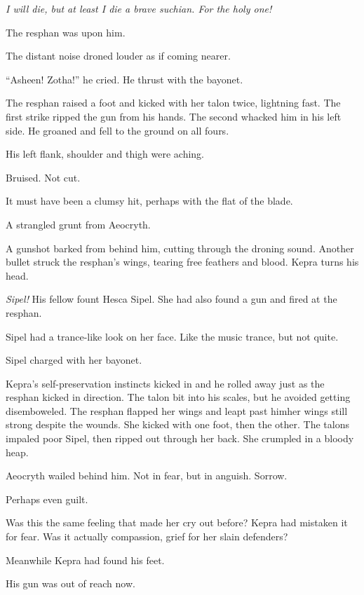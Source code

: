 \documentclass
  [a4paper,
   12pt,
   oneside
  ]%
  {article}
\begin{document}
\emph{I will die, but at least I die a brave suchian. For the holy one!} 

The resphan was upon him.

The distant noise droned louder as if coming nearer.

``Asheen! Zotha!'' he cried. He thrust with the bayonet.

The resphan raised a foot and kicked with her talon twice, lightning fast. 
The first strike ripped the gun from his hands. 
The second whacked him in his left side. He groaned and fell to the ground on all fours. 

His left flank, shoulder and thigh were aching. 

Bruised. Not cut. 

It must have been a clumsy hit, perhaps with the flat of the blade. 

A strangled grunt from Aeocryth.

A gunshot barked from behind him, cutting through the droning sound. 
Another bullet struck the resphan’s wings, tearing free feathers and blood. 
Kepra turns his head. 

\emph{Sipel!} His fellow fount Hesca Sipel. She had also found a gun and fired at the resphan.

Sipel had a trance-like look on her face.
Like the music trance, but not quite.

Sipel charged with her bayonet. 

Kepra's self-preservation instincts kicked in and he rolled away just as the resphan kicked in direction. 
The talon bit into his scales, but he avoided getting disemboweled.
The resphan flapped her wings and leapt past him\dash{}her wings still strong despite the wounds. 
She kicked with one foot, then the other.
The talons impaled poor Sipel, then ripped out through her back. 
She crumpled in a bloody heap.

Aeocryth wailed behind him. 
Not in fear, but in anguish.
Sorrow. 

Perhaps even guilt.

Was this the same feeling that made her cry out before? Kepra had mistaken it for fear. Was it actually compassion, grief for her slain defenders?

Meanwhile Kepra had found his feet. 

His gun was out of reach now. 
\end{document}
